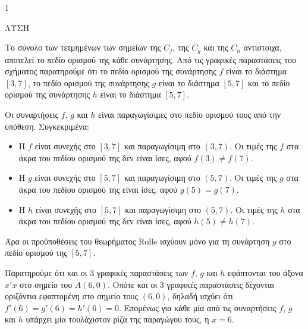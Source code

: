 \begin{ylh}{1}
    \item [Ύλη από εικόνα]
\end{ylh}
ΛΥΣΗ

\begin{alist}
    \item Το σύνολο των τετμημένων των σημείων της $C_f$, της $C_g$ και της $C_h$ αντίστοιχα, αποτελεί το πεδίο ορισμού της κάθε συνάρτησης. Από τις γραφικές παραστάσεις του σχήματος παρατηρούμε ότι το πεδίο ορισμού της συνάρτησης $f$ είναι το διάστημα $[3,7]$, το πεδίο ορισμού της συνάρτησης $g$ είναι το διάστημα $[5,7]$ και το πεδίο ορισμού της συνάρτησης $h$ είναι το διάστημα $[5,7]$.
    \item
    \begin{rlist}
        \item Οι συναρτήσεις $f$, $g$ και $h$ είναι παραγωγίσιμες στο πεδίο ορισμού τους από την υπόθεση. Συγκεκριμένα:
        \begin{itemize}
            \item Η $f$ είναι συνεχής στο $[3,7]$ και παραγωγίσιμη στο $(3,7)$. Οι τιμές της $f$ στα άκρα του πεδίου ορισμού της δεν είναι ίσες, αφού $f(3) \neq f(7)$.
            \item Η $g$ είναι συνεχής στο $[5,7]$ και παραγωγίσιμη στο $(5,7)$. Οι τιμές της $g$ στα άκρα του πεδίου ορισμού της είναι ίσες, αφού $g(5) = g(7)$.
            \item Η $h$ είναι συνεχής στο $[5,7]$ και παραγωγίσιμη στο $(5,7)$. Οι τιμές της $h$ στα άκρα του πεδίου ορισμού της δεν είναι ίσες, αφού $h(5) \neq h(7)$.
        \end{itemize}
        Άρα οι προϋποθέσεις του θεωρήματος Rolle ισχύουν μόνο για τη συνάρτηση $g$ στο πεδίο ορισμού της $[5,7]$.
        \item Παρατηρούμε ότι και οι 3 γραφικές παραστάσεις των $f$, $g$ και $h$ εφάπτονται του άξονα $x'x$ στο σημείο του $A(6,0)$. Οπότε και οι 3 γραφικές παραστάσεις δέχονται οριζόντια εφαπτομένη στο σημείο τους $(6,0)$, δηλαδή ισχύει ότι $f'(6) = g'(6) = h'(6) = 0$. Επομένως για κάθε μία από τις συναρτήσεις $f$, $g$ και $h$ υπάρχει μία τουλάχιστον ρίζα της παραγώγου τους, η $x = 6$.
    \end{rlist}
\end{alist}